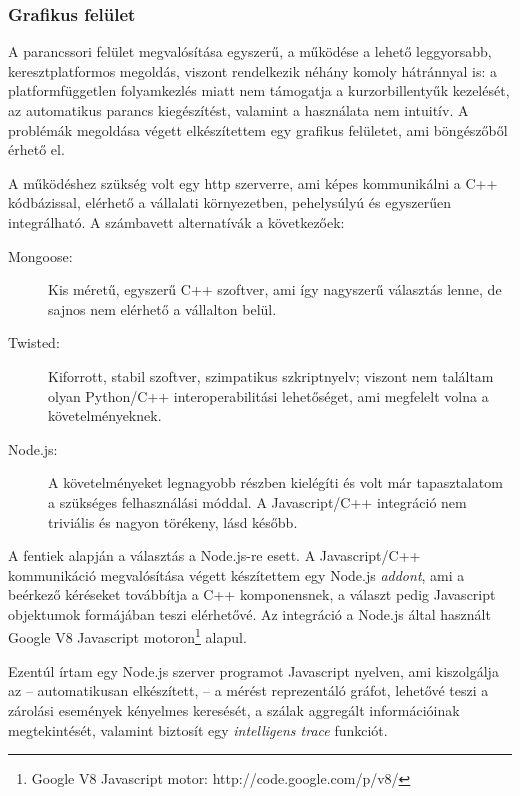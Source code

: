     \subsubsection{Grafikus felület}
    A parancssori felület megvalósítása egyszerű, a működése a lehető leggyorsabb, keresztplatformos megoldás, viszont rendelkezik néhány komoly hátránnyal is: a platformfüggetlen folyamkezlés miatt nem támogatja a kurzorbillentyűk kezelését, az automatikus parancs kiegészítést, valamint a használata nem intuitív. A problémák megoldása végett elkészítettem egy grafikus felületet, ami böngészőből érhető el.
    
    A működéshez szükség volt egy http szerverre, ami képes kommunikálni a C++ kódbázissal, elérhető a vállalati környezetben, pehelysúlyú és egyszerűen integrálható. A számbavett alternatívák a következőek:
    
\begin{description}
    \item[Mongoose:\footnotemark] Kis méretű, egyszerű C++ szoftver, ami így nagyszerű választás lenne, de sajnos nem elérhető a vállalton belül.
    \item[Twisted:\footnotemark]  Kiforrott, stabil szoftver, szimpatikus szkriptnyelv; viszont nem találtam olyan Python/C++ interoperabilitási lehetőséget, ami megfelelt volna a követelményeknek.
    \item[Node.js:\footnotemark]  A követelményeket legnagyobb részben kielégíti és volt már tapasztalatom a szükséges felhasználási móddal. A Javascript/C++ integráció nem triviális és nagyon törékeny, lásd később.
   
\end{description}
%    
    A fentiek alapján a választás a Node.js-re esett. A Javascript/C++ kommunikáció megvalósítása végett készítettem egy Node.js \emph{addont}, ami a beérkező kéréseket továbbítja a C++ komponensnek, a választ pedig Javascript objektumok formájában teszi elérhetővé. Az integráció a Node.js által használt Google V8 Javascript motoron\footnote{Google V8 Javascript motor: http://code.google.com/p/v8/} alapul.
   
    Ezentúl írtam egy Node.js szerver programot Javascript nyelven, ami kiszolgálja az -- automatikusan elkészített, -- a mérést reprezentáló gráfot, lehetővé teszi a zárolási események kényelmes keresését, a szálak aggregált információinak megtekintését, valamint biztosít egy \emph{intelligens trace} funkciót.
    
